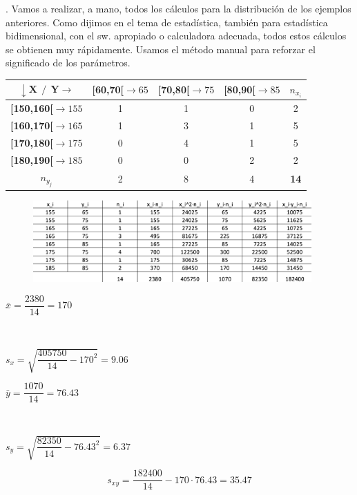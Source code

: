 \begin{example}
.	Vamos a realizar, a mano, todos los cálculos para la distribución de los ejemplos anteriores.	 Como dijimos  en el tema de estadística, también para estadística bidimensional, con el sw. apropiado o calculadora adecuada, todos estos cálculos se obtienen muy rápidamente. Usamos el método manual para reforzar el significado de los parámetros.

\begin{table}[H]
\centering
\begin{tabular}{c|c|c|c|c}
$\boldsymbol{\downarrow X \ \ / \ \ Y \rightarrow}$ & \textbf{{[}60,70{[}$\to 65$} & \textbf{{[}70,80{[}$\to 75$} & \textbf{{[}80,90{[}$\to 85$} & \textbf{$n_{x_i}$} \\ \hline
\textbf{{[}150,160{[}$\to 155$} & 1 & 1 & 0 & 2 \\ \hline
\textbf{{[}160,170{[}$\to 165$} & 1 & 3 & 1 & 5 \\ \hline
\textbf{{[}170,180{[}$\to 175$} & 0 & 4 & 1 & 5 \\ \hline
\textbf{{[}180,190{[}$\to 185$} & 0 & 0 & 2 & 2 \\ \hline
\textbf{$n_{y_j}$} & 2 & 8 & 4 & \textbf{14}
\end{tabular}
\end{table}

	\begin{figure}[H]
			\centering
			\includegraphics[width=0.95\textwidth]{imagenes/imagenes03/T03IM04.png}
	\end{figure}

\begin{multicols}{2}
$\bar x=\dfrac{2380}{14}=170$

$\quad$

$s_x=\sqrt{\dfrac{405750}{14}-170^2}=9.06$

$\bar y=\dfrac{1070}{14}=76.43$	

$\quad$

$s_y=\sqrt{\dfrac{82350}{14}-76.43^2}=6.37$
\end{multicols}
$$s_{xy}=\dfrac{182400}{14}-170\cdot 76.43=35.47$$

\end{example}


